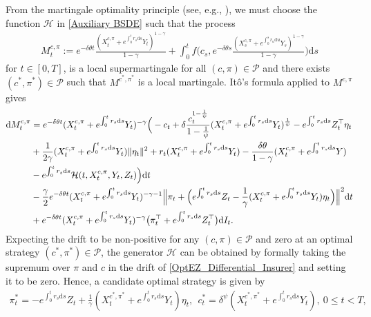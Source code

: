 \documentclass[12,reqno]{amsart}
\numberwithin{equation}{section}
\begin{document}
From the martingale optimality principle (see, e.g., \cite{hu2005utility,xing2017consumption}), we must choose the function $\mathcal{H}$ in \eqref{Auxiliary BSDE} such that the process
\begin{align}\label{Optimal martingale}
	M_{t}^{c,\pi}:=e^{-\delta\theta t}\frac{(X_{t}^{c,\pi}+e^{\int_{0}^{t}r_{s}\mathrm{d}s}Y_{t})^{1-\gamma}}{1-\gamma}+\int_{0}^{t}f\big(c_{s},{e^{-\delta\theta s}}\frac{(X_{s}^{c,\pi}+e^{\int_{0}^{s}r_{u}\mathrm{d}u}Y_{s})^{1-\gamma}}{1-\gamma}\big)\mathrm{d}s
\end{align}
for $t\in[0,T]$, is a local supermartingale for all $(c,\pi)\in\mathcal{P}$ and there exists $(c^{*},\pi^{*})\in\mathcal{P}$ such that $M^{c^{*},\pi^{*}}$ is a local martingale. It{\^o}'s formula applied to $M^{c,\pi}$ gives
\begin{align}\label{OptEZ_Differential_Insurer}
	\mathrm{d}M_{t}^{c,\pi}&=e^{-\delta\theta t} (X_{t}^{c,\pi}+e^{\int_{0}^{t}r_{s}\mathrm{d}s}Y_{t})^{-\gamma}\Big(-c_{t}+\delta\frac{c_{t}^{1-\frac{1}{\psi}}}{1-\frac{1}{\psi}}(X_{t}^{c,\pi}+e^{\int_{0}^{t}r_{s}\mathrm{d}s}Y_{t})^{\frac{1}{\psi}}-e^{\int_{0}^{t}r_{s}\mathrm{d}s}Z_{t}^{\top}\eta_{t}\notag\\
	&+\frac{1}{2\gamma}(X_{t}^{c,\pi}+e^{\int_{0}^{t}r_{s}\mathrm{d}s}Y_{t})\|\eta_{t}\|^{2}+r_{t}(X_{t}^{c,\pi}+e^{\int_{0}^{t}r_{s}\mathrm{d}s}Y_{t})-\frac{\delta\theta}{1-\gamma}(X_{t}^{c,\pi}+e^{\int_{0}^{t}r_{s}\mathrm{d}s}Y)\notag\\
	&-e^{\int_{0}^{t}r_{s}\mathrm{d}s}\mathcal{H}(t,X_{t}^{c,\pi},Y_{t},Z_{t})\Big)\mathrm{d}t\notag\\
	&-\frac{\gamma}{2}e^{-\delta\theta t} (X_{t}^{c,\pi}+e^{\int_{0}^{t}r_{s}\mathrm{d}s}Y_{t})^{-\gamma-1}\Big\|\pi_{t}+\Big(e^{\int_{0}^{t}r_{s}\mathrm{d}s}Z_{t}-\frac{1}{\gamma}(X_{t}^{c,\pi}+e^{\int_{0}^{t}r_{s}\mathrm{d}s}Y_{t})\eta_{t}\Big)\Big\|^{2}\mathrm{d}t\notag\\
	&+e^{-\delta\theta t} (X_{t}^{c,\pi}+e^{\int_{0}^{t}r_{s}\mathrm{d}s}Y_{t})^{-\gamma}\big(\pi_{t}^{\top}+e^{\int_{0}^{t}r_{s}\mathrm{d}s}Z_{t}^{\top}\big)\mathrm{d}I_{t}.
\end{align}
Expecting the drift to be non-positive for any $(c,\pi)\in\mathcal{P}$ and zero at an optimal strategy $(c^{*},\pi^{*})\in\mathcal{P}$, the generator $\mathcal{H}$ can be obtained by formally taking the supremum over $\pi$ and $c$ in the drift of \eqref{OptEZ_Differential_Insurer} and setting it to be zero. Hence, a candidate optimal strategy is given by
\begin{align}\label{Candidate optimal strategy}
	\pi_{t}^{*}=-e^{\int_{0}^{t}r_{s}\mathrm{d}s}Z_{t}+\frac{1}{\gamma}(X_{t}^{c^{*},\pi^{*}}+e^{\int_{0}^{t}r_{s}\mathrm{d}s}Y_{t})\eta_{t},~~c_{t}^{*}=\delta^{\psi}(X_{t}^{c^{*},\pi^{*}}+e^{\int_{0}^{t}r_{s}\mathrm{d}s}Y_{t}),~0\le t<T,
\end{align}
\end{document}
